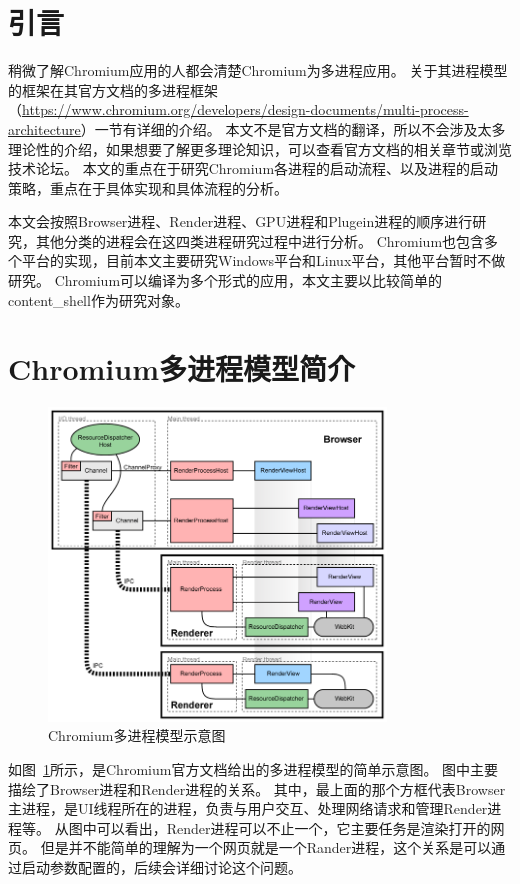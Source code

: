 
\section{引言}
稍微了解Chromium应用的人都会清楚Chromium为多进程应用。
关于其进程模型的框架在其官方文档的多进程框架（\url{https://www.chromium.org/developers/design-documents/multi-process-architecture}）一节有详细的介绍。
本文不是官方文档的翻译，所以不会涉及太多理论性的介绍，如果想要了解更多理论知识，可以查看官方文档的相关章节或浏览技术论坛。
本文的重点在于研究Chromium各进程的启动流程、以及进程的启动策略，重点在于具体实现和具体流程的分析。

本文会按照Browser进程、Render进程、GPU进程和Plugein进程的顺序进行研究，其他分类的进程会在这四类进程研究过程中进行分析。
Chromium也包含多个平台的实现，目前本文主要研究Windows平台和Linux平台，其他平台暂时不做研究。
Chromium可以编译为多个形式的应用，本文主要以比较简单的content\_shell作为研究对象。

\section{Chromium多进程模型简介}

\begin{figure}[H] 
  \centering 
  \includegraphics[width=0.80\textwidth]{image/process_study/multi_process_architecture.png} 
  \caption{Chromium多进程模型示意图} \label{fig:multi_process_architecture} 
\end{figure}

如图~\ref{fig:multi_process_architecture}所示，是Chromium官方文档给出的多进程模型的简单示意图。
图中主要描绘了Browser进程和Render进程的关系。
其中，最上面的那个方框代表Browser主进程，是UI线程所在的进程，负责与用户交互、处理网络请求和管理Render进程等。
从图中可以看出，Render进程可以不止一个，它主要任务是渲染打开的网页。
但是并不能简单的理解为一个网页就是一个Rander进程，这个关系是可以通过启动参数配置的，后续会详细讨论这个问题。

